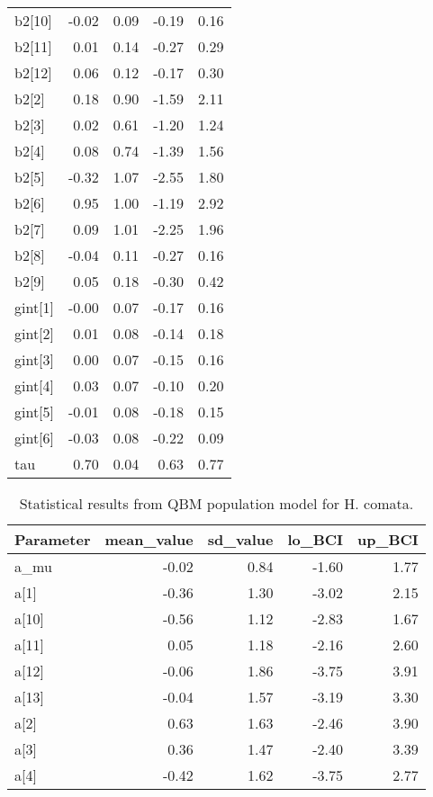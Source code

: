 \documentclass[12pt,]{article}
\begin{document}
\begin{table}[ht]
{\begin{tabular}{lrrrr}
  b2[10] & -0.02 & 0.09 & -0.19 & 0.16 \\ 
  b2[11] & 0.01 & 0.14 & -0.27 & 0.29 \\ 
  b2[12] & 0.06 & 0.12 & -0.17 & 0.30 \\ 
  b2[2] & 0.18 & 0.90 & -1.59 & 2.11 \\ 
  b2[3] & 0.02 & 0.61 & -1.20 & 1.24 \\ 
  b2[4] & 0.08 & 0.74 & -1.39 & 1.56 \\ 
  b2[5] & -0.32 & 1.07 & -2.55 & 1.80 \\ 
  b2[6] & 0.95 & 1.00 & -1.19 & 2.92 \\ 
  b2[7] & 0.09 & 1.01 & -2.25 & 1.96 \\ 
  b2[8] & -0.04 & 0.11 & -0.27 & 0.16 \\ 
  b2[9] & 0.05 & 0.18 & -0.30 & 0.42 \\ 
  gint[1] & -0.00 & 0.07 & -0.17 & 0.16 \\ 
  gint[2] & 0.01 & 0.08 & -0.14 & 0.18 \\ 
  gint[3] & 0.00 & 0.07 & -0.15 & 0.16 \\ 
  gint[4] & 0.03 & 0.07 & -0.10 & 0.20 \\ 
  gint[5] & -0.01 & 0.08 & -0.18 & 0.15 \\ 
  gint[6] & -0.03 & 0.08 & -0.22 & 0.09 \\ 
  tau & 0.70 & 0.04 & 0.63 & 0.77 \\ 
   \hline
\end{tabular}
}
\end{table}\begin{table}[ht]
\centering
\caption{Statistical results from QBM population model for H. comata.} 
{\footnotesize
\begin{tabular}{lrrrr}
  \hline
Parameter & mean\_value & sd\_value & lo\_BCI & up\_BCI \\ 
  \hline
a\_mu & -0.02 & 0.84 & -1.60 & 1.77 \\ 
  a[1] & -0.36 & 1.30 & -3.02 & 2.15 \\ 
  a[10] & -0.56 & 1.12 & -2.83 & 1.67 \\ 
  a[11] & 0.05 & 1.18 & -2.16 & 2.60 \\ 
  a[12] & -0.06 & 1.86 & -3.75 & 3.91 \\ 
  a[13] & -0.04 & 1.57 & -3.19 & 3.30 \\ 
  a[2] & 0.63 & 1.63 & -2.46 & 3.90 \\ 
  a[3] & 0.36 & 1.47 & -2.40 & 3.39 \\ 
  a[4] & -0.42 & 1.62 & -3.75 & 2.77 \\ 

\end{tabular}}
\end{table}
\end{document}
